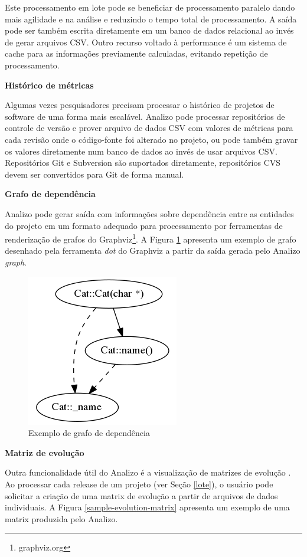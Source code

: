 Este processamento em lote pode se beneficiar de processamento paralelo dando
mais agilidade e na análise e reduzindo o tempo total de processamento.  A
saída pode ser também escrita diretamente em um banco de dados relacional ao
invés de gerar arquivos CSV. Outro recurso voltado à performance é um sistema
de cache para as informações previamente calculadas, evitando repetição de
processamento.

{\bf Histórico de métricas}

Algumas vezes pesquisadores precisam processar o histórico de projetos de
software de uma forma mais escalável. Analizo pode processar repositórios de
controle de versão e prover arquivo de dados CSV com valores de métricas para
cada revisão onde o código-fonte foi alterado no projeto, ou pode também gravar
os valores diretamente num banco de dados ao invés de usar arquivos CSV. Repositórios Git e
Subversion são suportados diretamente, repositórios CVS devem ser convertidos
para Git de forma manual.

{\bf Grafo de dependência}

Analizo pode gerar saída com informações sobre dependência entre as entidades
do projeto em um formato adequado para processamento por ferramentas de
renderização de grafos do Graphviz\footnote{graphviz.org}. A Figura
\ref{sample-graph} apresenta um exemplo de grafo desenhado pela ferramenta {\it
dot} do Graphviz a partir da saída gerada pelo Analizo {\it graph}.

\begin{figure}[h]
\center
\includegraphics[scale=0.4]{imagens/sample-graph.png}
\caption{Exemplo de grafo de dependência}
\label{sample-graph}
\end{figure}

{\bf Matriz de evolução}

Outra funcionalidade útil do Analizo é a visualização de matrizes de evolução
\cite{Lanza2001}. Ao processar cada release de um projeto (ver Seção
\ref{lote}), o usuário pode solicitar a criação de uma matrix de evolução a
partir de arquivos de dados individuais. A Figura \ref{sample-evolution-matrix}
apresenta um exemplo de uma matrix produzida pelo Analizo.

